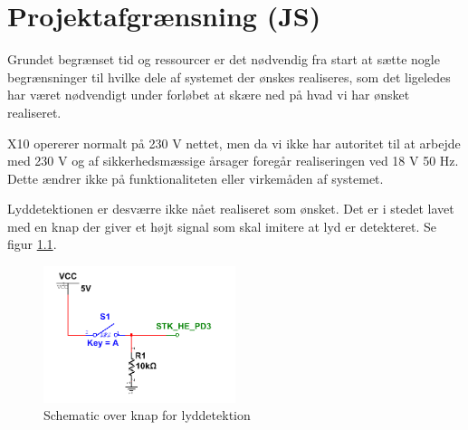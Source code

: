 \chapter{Projektafgrænsning (JS)}

Grundet begrænset tid og ressourcer er det nødvendig fra start at sætte nogle begrænsninger til hvilke dele af systemet der ønskes realiseres, som det ligeledes har været nødvendigt under forløbet at skære ned på hvad vi har ønsket realiseret. 

X10 opererer normalt på 230 V nettet, men da vi ikke har autoritet til at arbejde med 230 V og af sikkerhedsmæssige årsager foregår realiseringen ved 18 V 50 Hz. Dette ændrer ikke på funktionaliteten eller virkemåden af systemet. 

Lyddetektionen er desværre ikke nået realiseret som ønsket. Det er i stedet lavet med en knap der giver et højt signal som skal imitere at lyd er detekteret. Se figur \ref{fig:BABY_ALARM}. 

\begin{figure}[htbp]
  \centering
    \includegraphics[width=0.5\textwidth]{billeder/BABY_SWITCH}
    \caption{Schematic over knap for lyddetektion}
    \label{fig:BABY_ALARM}
\end{figure}

